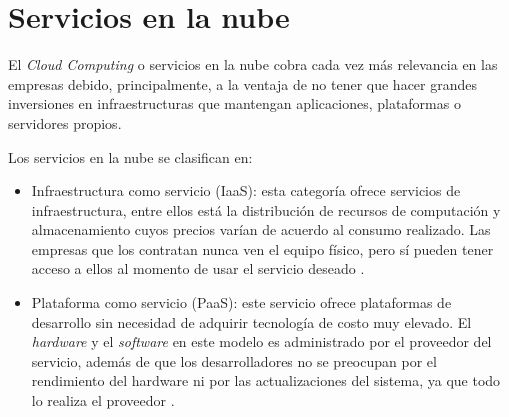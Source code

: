 \section{Servicios en la nube}

El \emph{Cloud Computing} o servicios en la nube cobra cada vez más relevancia en las empresas debido, principalmente, a la ventaja de no tener que hacer grandes inversiones en infraestructuras que mantengan aplicaciones, plataformas o servidores propios.

Los servicios en la nube se clasifican en:

\begin{itemize}
\item Infraestructura como servicio (IaaS): esta categoría ofrece servicios de infraestructura, entre ellos está la distribución de recursos de computación y almacenamiento cuyos precios varían de acuerdo al consumo realizado. Las empresas que los contratan nunca ven el equipo físico, pero sí pueden tener acceso a ellos al momento de usar el servicio deseado \citep{BOOK:2}.




\item Plataforma como servicio (PaaS): este servicio ofrece plataformas de desarrollo sin necesidad de adquirir tecnología de costo muy elevado. El \emph{hardware} y el \emph{software} en este modelo es administrado por el proveedor del servicio, además de que los desarrolladores no se preocupan por el rendimiento del hardware ni por las actualizaciones del sistema, ya que todo lo realiza el proveedor \citep{BOOK:2}.
 






\end{itemize}
